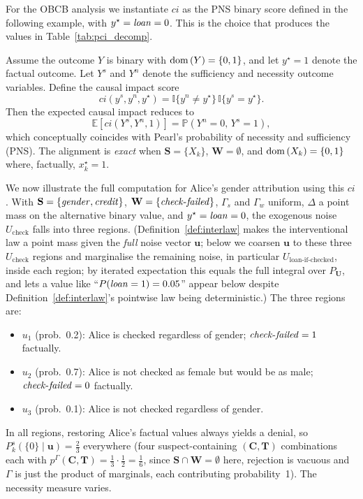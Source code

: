 For the OBCB analysis we instantiate $ci$ as the PNS binary score defined in the
following example, with $y^\star = \varname{loan} = 0$. This is the choice that produces
the values in Table~\ref{tab:pci_decomp}.

\begin{example}\label{ex:pns_binary}
Assume the outcome $Y$ is binary with $\operatorname{dom}\,(Y)=\{0,1\}$, and let $y^\star=1$ denote
the factual outcome. Let $Y^s$ and $Y^n$ denote the sufficiency and necessity
outcome variables. Define the causal impact score
\[
ci(y^s,y^n,y^\star)
=
\mathbb{I}\{y^n\neq y^\star\}\,\mathbb{I}\{y^s=y^\star\}.
\]
Then the expected causal impact reduces to
\[
\mathbb{E}\!\left[ci(Y^s,Y^n,1)\right]
=
\mathbb{P}(Y^n=0,\,Y^s=1),
\]
which conceptually coincides with Pearl's probability of necessity and sufficiency (PNS). The alignment is \emph{exact} when $\mathbf{S} = \{X_k\}$, $\mathbf{W}=\emptyset$, and $\operatorname{dom}\,(X_k)=\{0,1\}$ where, factually, $x_k^\star=1$.
\end{example}

We now illustrate the full computation for Alice's gender attribution using this $ci$.
With $\mathbf{S}=\{\varname{gender},\varname{credit}\}$,
$\mathbf{W}=\{\varname{check\text{-}failed}\}$, $\Gamma_s$ and $\Gamma_w$ uniform,
$\Delta$ a point mass on the alternative binary value, and $y^\star=\varname{loan}=0$,
the exogenous noise $U_\text{check}$ falls into three regions. (Definition~\ref{def:interlaw}
makes the interventional law a point mass given the \emph{full} noise vector
$\mathbf{u}$; below we coarsen $\mathbf{u}$ to these three $U_\text{check}$ regions and
marginalise the remaining noise, in particular $U_{\text{loan-if-checked}}$, inside each region; by iterated expectation this equals the full integral over
$P_{\mathbf{U}}$, and lets a value like ``$P(\varname{loan}=1)=0.05$'' appear
below despite Definition~\ref{def:interlaw}'s pointwise law being deterministic.)
The three regions are:
\begin{itemize}
\item $u_1$ (prob.\ 0.2): Alice is checked regardless of gender;
  $\varname{check\text{-}failed}=1$ factually.
\item $u_2$ (prob.\ 0.7): Alice is not checked as female but would be as male;
  $\varname{check\text{-}failed}=0$ factually.
\item $u_3$ (prob.\ 0.1): Alice is not checked regardless of gender.
\end{itemize}
In all regions, restoring Alice's factual values always yields a denial, so
$P_k^s(\{0\}\mid\mathbf{u})=\tfrac{2}{3}$ everywhere (four suspect-containing
$(\mathbf{C},\mathbf{T})$ combinations each with $p^\Gamma(\mathbf{C},\mathbf{T})=\tfrac{1}{3}\cdot\tfrac{1}{2}=\tfrac{1}{6}$,
since $\mathbf{S}\cap\mathbf{W}=\emptyset$ here, rejection is vacuous and
$\Gamma$ is just the product of marginals, each contributing probability~1).
The necessity measure varies.

